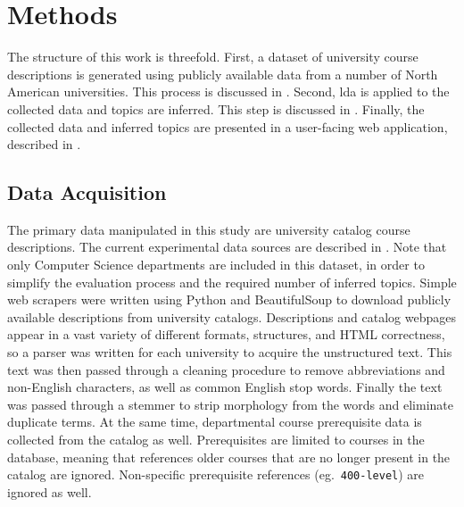 \section{Methods}
\label{sec:methods}


The structure of this work is threefold.
First, a dataset of university course descriptions is generated using publicly available data from a number of North American universities.
This process is discussed in .
Second, \ac{lda} is applied to the collected data and topics are inferred.
This step is discussed in .
Finally, the collected data and inferred topics are presented in a user-facing web application, described in .


\subsection{Data Acquisition}
\label{sec:data-acquisition}


The primary data manipulated in this study are university catalog course descriptions.
The current experimental data sources are described in .
Note that only Computer Science departments are included in this dataset, in order to simplify the evaluation process and the required number of inferred topics.
Simple web scrapers were written using Python and BeautifulSoup to download publicly available descriptions from university catalogs.
Descriptions and catalog webpages appear in a vast variety of different formats, structures, and HTML correctness, so a parser was written for each university to acquire the unstructured text.
This text was then passed through a cleaning procedure to remove abbreviations and non-English characters, as well as common English stop words.
Finally the text was passed through a stemmer to strip morphology from the words and eliminate duplicate terms.
At the same time, departmental course prerequisite data is collected from the catalog as well.
Prerequisites are limited to courses in the database, meaning that references older courses that are no longer present in the catalog are ignored.
Non-specific prerequisite references (eg.\ \texttt{400-level}) are ignored as well.


